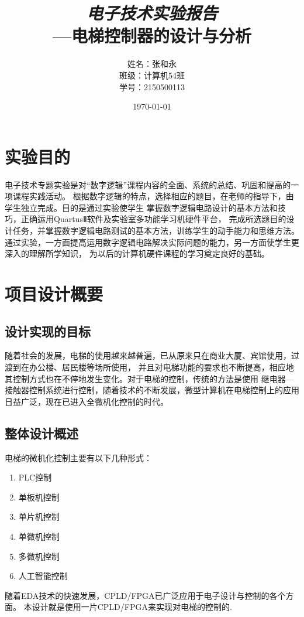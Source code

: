 \documentclass[UTF8]{article}
\title{ \emph{电子技术实验报告}\\---电梯控制器的设计与分析}
\author{姓名：张和永 \\班级：计算机54班 \\ 学号：2150500113}
\date{\today}
\begin{document}
\maketitle
\setcounter{tocdepth}{10}
\tableofcontents
\newpage

\section{实验目的}
电子技术专题实验是对“数字逻辑”课程内容的全面、系统的总结、巩固和提高的一项课程实践活动。
根据数字逻辑的特点，选择相应的题目，在老师的指导下，由学生独立完成。目的是通过实验使学生
掌握数字逻辑电路设计的基本方法和技巧，正确运用QuartusⅡ软件及实验室多功能学习机硬件平台，
完成所选题目的设计任务，并掌握数字逻辑电路测试的基本方法，训练学生的动手能力和思维方法。
通过实验，一方面提高运用数字逻辑电路解决实际问题的能力，另一方面使学生更深入的理解所学知识，
为以后的计算机硬件课程的学习奠定良好的基础。

\section{项目设计概要}

\subsection{设计实现的目标}
  随着社会的发展，电梯的使用越来越普遍，已从原来只在商业大厦、宾馆使用，过渡到在办公楼、居民楼等场所使用，
  并且对电梯功能的要求也不断提高，相应地其控制方式也在不停地发生变化。对于电梯的控制，传统的方法是使用
  继电器—接触器控制系统进行控制，随着技术的不断发展，微型计算机在电梯控制上的应用日益广泛，现在已进入全微机化控制的时代。

\subsection{整体设计概述}
电梯的微机化控制主要有以下几种形式：
\begin{enumerate}
\item PLC控制
\item 单板机控制
\item 单片机控制
\item 单微机控制
\item 多微机控制
\item 人工智能控制
\end{enumerate}
随着EDA技术的快速发展，CPLD/FPGA已广泛应用于电子设计与控制的各个方面。
本设计就是使用一片CPLD/FPGA来实现对电梯的控制的.
\end{document}
